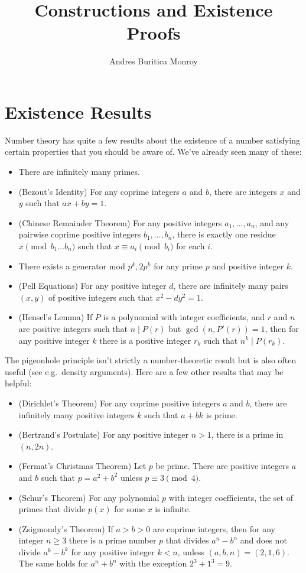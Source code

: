 \documentclass{article}
\title{Constructions and Existence Proofs}
\author{Andres Buritica Monroy}
\date{}
\begin{document}
\maketitle
\section{Existence Results}
Number theory has quite a few results about the existence of a number satisfying
certain properties that you should be aware of. We've already seen many of
these:
\begin{itemize}
  \item There are infinitely many primes.
  \item (Bezout's Identity)
    For any coprime integers $a$ and $b$, there are integers $x$ and $y$ such
    that $ax+by=1$.
  \item (Chinese Remainder Theorem)
    For any positive integers $a_1,\ldots,a_n$, and any pairwise coprime positive
    integers $b_1,\ldots,b_n$, there is exactly one residue $x\pmod {b_1\ldots
    b_n}$ such that $x\equiv a_i\pmod{b_i}$ for each $i$.
  \item There exists a generator mod $p^k,2p^k$ for any prime $p$ and positive
    integer $k$.
  \item (Pell Equations) For any positive integer $d$, there are infinitely many
    pairs $(x,y)$ of positive integers such that $x^2-dy^2=1$.
  \item (Hensel's Lemma) If $P$ is a polynomial with integer coefficients, and
    $r$ and $n$ are positive integers such that $n\mid P(r)$ but
    $\gcd(n,P'(r))=1$, then for any positive integer $k$ there is a positive
    integer $r_k$ such that $n^k\mid P(r_k)$.
\end{itemize}
The pigeonhole principle isn't strictly a number-theoretic result but is also
often useful (see e.g.\ density arguments).
Here are a few other results that may be helpful:
\begin{itemize}
  \item (Dirichlet's Theorem)
    For any coprime positive integers $a$ and $b$, there are infinitely many
    positive integers $k$ such that $a+bk$ is prime.
  \item (Bertrand's Postulate)
    For any positive integer $n>1$, there is a prime in $(n,2n)$.
  \item (Fermat's Christmas Theorem) Let $p$ be prime. There are positive
    integers $a$ and $b$ such that $p=a^2+b^2$ unless $p\equiv 3\pmod 4$.
  \item (Schur's Theorem) For any polynomial $p$ with integer coefficients, the
    set of primes that divide $p(x)$ for some $x$ is infinite.
  \item (Zsigmondy's Theorem) If $a>b>0$ are coprime integers, then for any
    integer $n\ge 3$ there is a prime number $p$ that divides $a^n-b^n$ and does
    not divide $a^k-b^k$ for any positive integer $k<n$, unless
    $(a,b,n)=(2,1,6)$. The same holds for $a^n+b^n$ with the exception
    $2^3+1^3=9$.
\end{itemize}
\end{document}
